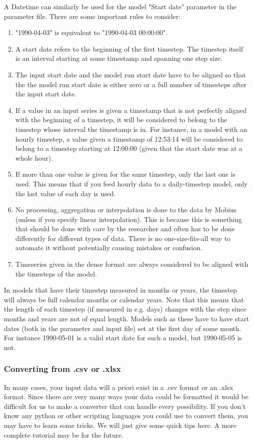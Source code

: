 \documentclass[11pt]{article}
\theoremstyle{definition}
\begin{document}
A Datetime can similarly be used for the model "Start date" parameter in the parameter file. There are some important rules to consider:
\begin{enumerate}[i]
\item "1990-04-03" is equivalent to "1990-04-03 00:00:00".
\item A start date refers to the beginning of the first timestep. The timestep itself is an interval starting at some timestamp and spanning one step size.
\item The input start date and the model run start date have to be aligned so that the the model run start date is either zero or a full number of timesteps after the input start date.
\item If a value in an input series is given a timestamp that is not perfectly aligned with the beginning of a timestep, it will be considered to belong to the timestep whose interval the timestamp is in. For instance, in a model with an hourly timestep, a value given a timestamp of 12:53:14 will be considered to belong to a timestep starting at 12:00:00 (given that the start date was at a whole hour).
\item If more than one value is given for the same timestep, only the last one is used. This means that if you feed hourly data to a daily-timestep model, only the last value of each day is used.
\item No processing, aggregation or interpolation is done to the data by Mobius (unless if you specify linear interpolation). This is because this is something that should be done with care by the researcher and often has to be done differently for different types of data. There is no one-size-fits-all way to automate it without potentially causing mistakes or confusion.
\item Timeseries given in the dense format are always considered to be aligned with the timesteps of the model.
\end{enumerate}

In models that have their timestep measured in months or years, the timestep will always be full calendar months or calendar years. Note that this means that the length of each timestep (if measured in e.g. days) changes with the step since months and years are not of equal length. Models such as these have to have start dates (both in the parameter and input file) set at the first day of some month. For instance 1990-05-01 is a valid start date for such a model, but 1990-05-05 is not.


\subsubsection{Converting from .csv or .xlsx}
In many cases, your input data will a priori exist in a .csv format or an .xlsx format. Since there are very many ways your data could be formatted it would be difficult for us to make a converter that can handle every possibility. If you don't know any python or other scripting languages you could use to convert them, you may have to learn some tricks. We will just give some quick tips here. A more complete tutorial may be for the future.
\end{document}
